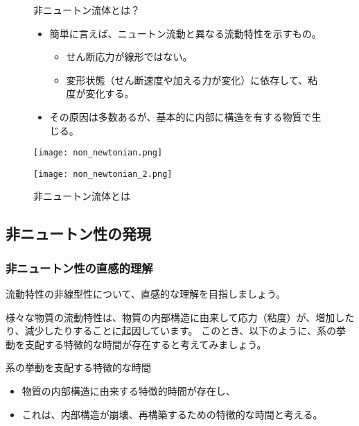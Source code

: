 \documentclass[uplatex,dvipdfmx,a4paper,11pt]{jsarticle}
\begin{document}
\begin{figure}[htb]
	\begin{center}
		\begin{minipage}{0.9\textwidth}
			\begin{itembox}[l]{非ニュートン流体とは？}
				\begin{itemize}
					\item 簡単に言えば、ニュートン流動と異なる流動特性を示すもの。
					\begin{itemize}
						\item せん断応力が線形ではない。
						\item 変形状態（せん断速度や加える力が変化）に依存して、粘度が変化する。
					\end{itemize}
					\item その原因は多数あるが、基本的に内部に構造を有する物質で生じる。
				\end{itemize}
			\end{itembox}
		\end{minipage}
		\begin{minipage}{0.45\textwidth}
			\begin{center}
			\texttt{[image: non\_newtonian.png]}
			\end{center}
		\end{minipage}
		\begin{minipage}{0.45\textwidth}
			\begin{center}
			\texttt{[image: non\_newtonian\_2.png]}
			\end{center}
		\end{minipage}
		\caption{非ニュートン流体とは}
		\label{fig:non_newtonian}
	\end{center}
\end{figure}

\subsection{非ニュートン性の発現}
\subsubsection{非ニュートン性の直感的理解}
流動特性の非線型性について、直感的な理解を目指しましょう。

様々な物質の流動特性は、物質の内部構造に由来して応力（粘度）が、増加したり、減少したりすることに起因しています。
このとき、以下のように、系の挙動を支配する特徴的な時間が存在すると考えてみましょう。
\begin{itembox}[l]{系の挙動を支配する特徴的な時間}
	\begin{itemize}
		\item 物質の内部構造に由来する特徴的時間が存在し、
		\item これは、内部構造が崩壊、再構築するための特徴的な時間と考える。
	\end{itemize}
\end{itembox}
\end{document}
